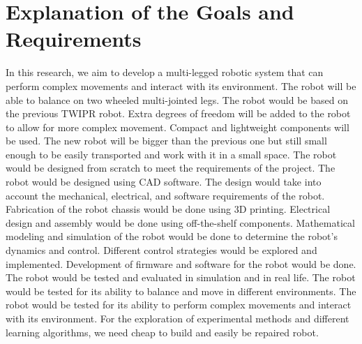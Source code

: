 \section{Explanation of the Goals and Requirements}
In this research, we aim to develop a multi-legged robotic system that can perform complex movements and interact with its environment.
The robot will be able to balance on two wheeled multi-jointed legs.
The robot would be based on the previous TWIPR robot.
Extra degrees of freedom will be added to the robot to allow for more complex movement.
Compact and lightweight components will be used.
The new robot will be bigger than the previous one but still small enough to be easily transported and work with it in a small space.
The robot would be designed from scratch to meet the requirements of the project.
The robot would be designed using CAD software.
The design would take into account the mechanical, electrical, and software requirements of the robot.
Fabrication of the robot chassis would be done using 3D printing.
Electrical design and assembly would be done using off-the-shelf components.
Mathematical modeling and simulation of the robot would be done to determine the robot's dynamics and control.
Different control strategies would be explored and implemented.
Development of firmware and software for the robot would be done.
The robot would be tested and evaluated in simulation and in real life.
The robot would be tested for its ability to balance and move in different environments.
The robot would be tested for its ability to perform complex movements and interact with its environment.
For the exploration of experimental methods and different learning algorithms, we need cheap to build and easily be repaired robot.
